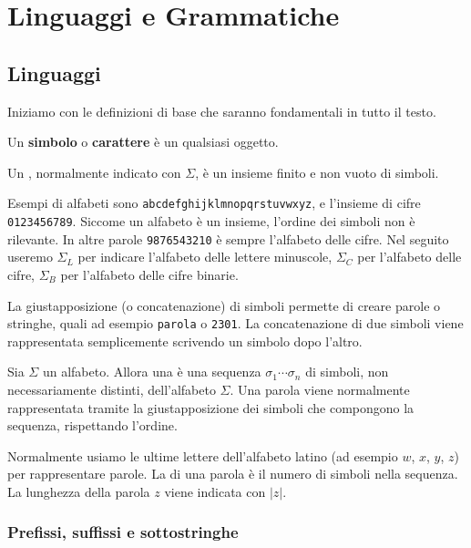 \chapter{Linguaggi e Grammatiche}\label{cha:linguaggi+grammatiche}

\section{Linguaggi}
Iniziamo con le definizioni di base che saranno fondamentali in tutto il testo.

Un \textbf{simbolo} o \textbf{carattere} è un qualsiasi oggetto.


\begin{definition}[Alfabeto]\label{def:alfabeto}
	Un , normalmente indicato con $\Sigma$, è un insieme finito e non vuoto di simboli.
\end{definition}

Esempi di alfabeti sono \texttt{abcdefghijklmnopqrstuvwxyz}, e l'insieme di cifre \texttt{0123456789}.
Siccome un alfabeto è un insieme, l'ordine dei simboli non è rilevante.
In altre parole \texttt{9876543210} è sempre l'alfabeto delle cifre.
Nel seguito useremo $\Sigma_{L}$ per indicare l'alfabeto delle lettere minuscole, $\Sigma_{C}$ per l'alfabeto delle cifre,
$\Sigma_{B}$ per l'alfabeto delle cifre binarie.


La giustapposizione (o concatenazione) di simboli permette di creare parole o stringhe, quali ad
esempio \texttt{parola} o \texttt{2301}.
La concatenazione di due simboli viene rappresentata semplicemente scrivendo un simbolo dopo l'altro.


\begin{definition}[Parola]\label{def:parola}
	Sia $\Sigma$ un alfabeto.
	Allora una  è una sequenza $\sigma_{1}\cdots\sigma_{n}$ di simboli, non necessariamente
	distinti, dell'alfabeto $\Sigma$.
	Una parola viene normalmente rappresentata tramite la giustapposizione dei
	simboli che compongono la sequenza, rispettando l'ordine.
\end{definition}

Normalmente usiamo le ultime lettere dell'alfabeto latino (ad esempio $w$, $x$,
$y$, $z$) per rappresentare parole.
La  di una parola è il numero di simboli nella sequenza.
La lunghezza della parola $z$ viene indicata con $|z|$.


\subsection{Prefissi, suffissi e sottostringhe}\label{sec:prefissi-suffissi}



